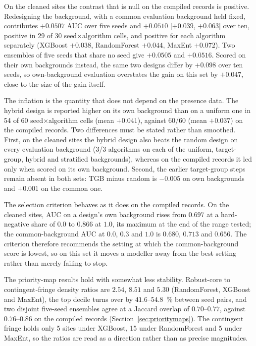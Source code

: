 \documentclass[12pt]{article}
\begin{document}
On the cleaned sites the contrast that is null on the compiled records is positive.
Redesigning the background, with a common evaluation background held fixed, contributes $+0.0507$ AUC over five seeds and $+0.0510$ [$+0.039$, $+0.063$] over ten, positive in 29 of 30 seed$\times$algorithm cells, and positive for each algorithm separately (XGBoost $+0.038$, RandomForest $+0.044$, MaxEnt $+0.072$).
Two ensembles of five seeds that share no seed give $+0.0505$ and $+0.0516$.
Scored on their own backgrounds instead, the same two designs differ by $+0.098$ over ten seeds, so own-background evaluation overstates the gain on this set by $+0.047$, close to the size of the gain itself.

The inflation is the quantity that does not depend on the presence data.
The hybrid design is reported higher on its own background than on a uniform one in 54 of 60 seed$\times$algorithm cells (mean $+0.041$), against 60/60 (mean $+0.037$) on the compiled records.
Two differences must be stated rather than smoothed.
First, on the cleaned sites the hybrid design also beats the random design on every evaluation background (3/3 algorithms on each of the uniform, target-group, hybrid and stratified backgrounds), whereas on the compiled records it led only when scored on its own background.
Second, the earlier target-group steps remain absent in both sets: TGB minus random is $-0.005$ on own backgrounds and $+0.001$ on the common one.

The selection criterion behaves as it does on the compiled records.
On the cleaned sites, AUC on a design's own background rises from $0.697$ at a hard-negative share of $0.0$ to $0.866$ at $1.0$, its maximum at the end of the range tested; the common-background AUC at $0.0$, $0.3$ and $1.0$ is $0.680$, $0.713$ and $0.656$.
The criterion therefore recommends the setting at which the common-background score is lowest, so on this set it moves a modeller away from the best setting rather than merely failing to stop.

The priority-map results hold with somewhat less stability.
Robust-core to contingent-fringe density ratios are $2.54$, $8.51$ and $5.30$ (RandomForest, XGBoost and MaxEnt), the top decile turns over by $41.6$--$54.8$~\% between seed pairs, and two disjoint five-seed ensembles agree at a Jaccard overlap of $0.70$--$0.77$, against $0.76$--$0.86$ on the compiled records (Section~\ref{sec:prioritymaps}).
The contingent fringe holds only 5 sites under XGBoost, 15 under RandomForest and 5 under MaxEnt, so the ratios are read as a direction rather than as precise magnitudes.
\end{document}
